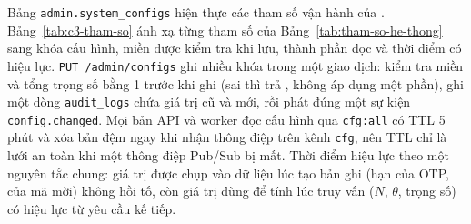 Bảng \texttt{admin.system\_configs} hiện thực các tham số vận hành của . Bảng~\ref{tab:c3-tham-so} ánh xạ từng tham số của Bảng~\ref{tab:tham-so-he-thong} sang khóa cấu hình, miền được kiểm tra khi lưu, thành phần đọc và thời điểm có hiệu lực. \texttt{PUT /admin/configs} ghi nhiều khóa trong một giao dịch: kiểm tra miền và tổng trọng số bằng 1 trước khi ghi (sai thì trả , không áp dụng một phần), ghi một dòng \texttt{audit\_logs} chứa giá trị cũ và mới, rồi phát đúng một sự kiện \texttt{config.changed}. Mọi bản API và worker đọc cấu hình qua \texttt{cfg:all} có TTL 5 phút và xóa bản đệm ngay khi nhận thông điệp trên kênh \texttt{cfg}, nên TTL chỉ là lưới an toàn khi một thông điệp Pub/Sub bị mất. Thời điểm hiệu lực theo một nguyên tắc chung: giá trị được chụp vào dữ liệu lúc tạo bản ghi (hạn của OTP, của mã mời) không hồi tố, còn giá trị dùng để tính lúc truy vấn ($N$, $\theta$, trọng số) có hiệu lực từ yêu cầu kế tiếp.

